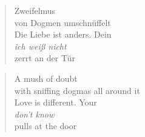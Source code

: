 
\cleartorecto


\begin{verse}

Zweifelmus\\
von Dogmen umschnüffelt\\
Die Liebe ist anders. Dein\\
\emph{ich weiß nicht}\\
zerrt an der Tür

\end{verse}

\cleartoverso


\begin{verse}

A mush of doubt\\
with sniffing dogmas all around it\\
Love is different. Your\\
\emph{don't know}\\
pulls at the door

\end{verse}
